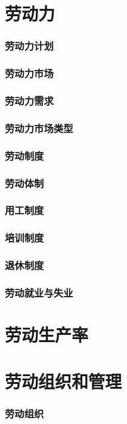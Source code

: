 \documentclass[UTF8]{../../RepresentationUniverse}
\begin{document}
\section{劳动力}
    \subsubsection{劳动力计划}
    \subsubsection{劳动力市场}
    \subsubsection{劳动力需求}
    \subsubsection{劳动力市场类型}
    \subsubsection{劳动制度}
    \subsubsection{劳动体制}
    \subsubsection{用工制度}
    \subsubsection{培训制度}
    \subsubsection{退休制度}
    \subsubsection{劳动就业与失业}
\section{劳动生产率}
\section{劳动组织和管理}
    \subsubsection{劳动组织}
\end{document}
